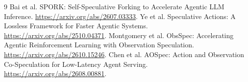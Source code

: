 \documentclass[UTF8,11pt]{ctexart}
\begin{document}
\begin{thebibliography}{9}
 Bai et al. SPORK: Self-Speculative Forking to Accelerate Agentic LLM Inference.
\url{https://arxiv.org/abs/2607.03333}.
 Ye et al. Speculative Actions: A Lossless Framework for Faster Agentic Systems.
\url{https://arxiv.org/abs/2510.04371}.
 Montgomery et al. ObsSpec: Accelerating Agentic Reinforcement Learning with Observation Speculation.
\url{https://arxiv.org/abs/2610.15246}.
 Chen et al. AOSpec: Action and Observation Co-Speculation for Low-Latency Agent Serving.
\url{https://arxiv.org/abs/2608.00881}.
\end{thebibliography}
\end{document}
